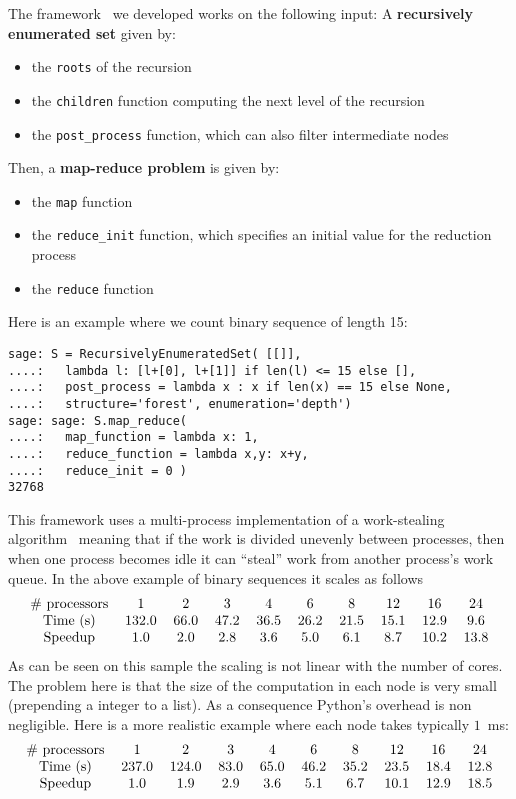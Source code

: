 \documentclass{deliverablereport}
\begin{document}
The framework~\cite{map-reduce} we developed works on the following input:
A \textbf{recursively enumerated set} given by:
\begin{itemize}
\item the \texttt{roots} of the recursion
\item the \texttt{children} function computing the next level of the recursion
\item the \texttt{post\_process} function, which can also filter intermediate nodes
\end{itemize}
Then, a \textbf{map-reduce problem} is given by:
\begin{itemize}
\item the \texttt{map} function
\item the \verb|reduce_init| function, which specifies an initial value for
    the reduction process
\item the \texttt{reduce} function
\end{itemize}
Here is an example where we count binary sequence of length 15:
\begin{verbatim}
sage: S = RecursivelyEnumeratedSet( [[]],
....:   lambda l: [l+[0], l+[1]] if len(l) <= 15 else [],
....:   post_process = lambda x : x if len(x) == 15 else None,
....:   structure='forest', enumeration='depth') 
sage: sage: S.map_reduce(
....:   map_function = lambda x: 1,
....:   reduce_function = lambda x,y: x+y,
....:   reduce_init = 0 )
32768
\end{verbatim}
This framework uses a multi-process implementation of a work-stealing
algorithm~\cite{BlumofeL99, BlumofeL99} meaning that if the work is divided
unevenly between processes, then when one process becomes idle it can ``steal''
work from another process's work queue. In the above example of binary
sequences it scales as follows
\[\begin{tabular}{ccccccccccccccc}
\# processors & 1 & 2  & 3 & 4 & 6 & 8 & 12 & 16 & 24\\
Time (s)      & 132.0 & 66.0 & 47.2 & 36.5 & 26.2 & 21.5 & 15.1 & 12.9 & 9.6
    \\
Speedup & 1.0 & 2.0 & 2.8 & 3.6 & 5.0 & 6.1 & 8.7 & 10.2 & 13.8 \\
\end{tabular}
\]
As can be seen on this sample the scaling is not linear with the number of
cores. The problem here is that the size of the computation in each node is
very small (prepending a integer to a list). As a consequence Python's
overhead is non negligible. Here is a more realistic example where each node
takes typically $1$~ms:
\[\begin{tabular}{ccccccccccccccc}
\# processors & 1 & 2  & 3 & 4 & 6 & 8 & 12 & 16 & 24\\
Time (s)      & 237.0 & 124.0 & 83.0 & 65.0 & 46.2 & 35.2 & 23.5 & 18.4 & 12.8
    \\
Speedup & 1.0 & 1.9 & 2.9 & 3.6 & 5.1 & 6.7 & 10.1 & 12.9 & 18.5
\end{tabular}
\]
\end{document}
